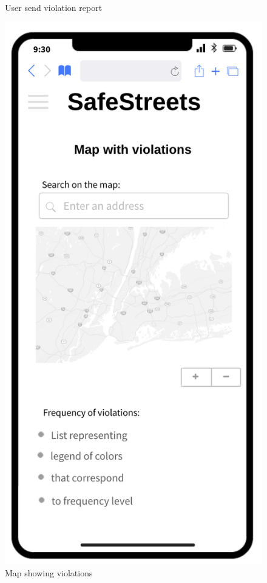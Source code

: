 \begin{figure}[H]
\begin{minipage}[b]{0.40\textwidth}
			\caption{User send violation report}
		\end{minipage}
		\hfill
		\begin{minipage}[b]{0.40\textwidth}
			\includegraphics[width=\textwidth]{Images/rasd-mocks/violationsMap.png}
			\caption{Map showing violations}
		\end{minipage}
	\end{figure}

